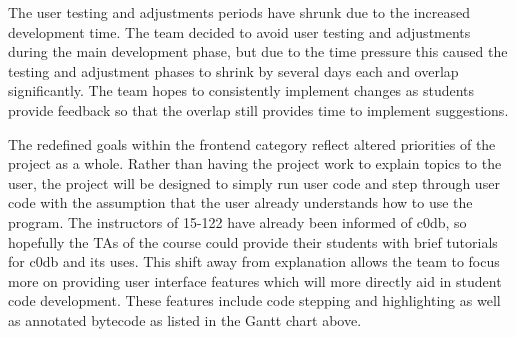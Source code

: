 \documentclass[11pt]{article}
\begin{document}
\par
The user testing and adjustments periods have shrunk due to the increased
development time. The team decided to avoid user testing and adjustments during
the main development phase, but due to the time pressure this caused the
testing and adjustment phases to shrink by several days each and overlap
significantly. The team hopes to consistently implement changes as students
provide feedback so that the overlap still provides time to implement
suggestions.
\par
The redefined goals within the frontend category reflect altered priorities of
the project as a whole. Rather than having the project work to explain topics
to the user, the project will be designed to simply run user code and step
through user code with the assumption that the user already understands how to
use the program. The instructors of 15-122 have already been informed of c0db,
so hopefully the TAs of the course could provide their students with brief
tutorials for c0db and its uses. This shift away from explanation allows the
team to focus more on providing user interface features which will more
directly aid in student code development. These features include code stepping
and highlighting as well as annotated bytecode as listed in the Gantt chart
above.
\end{document}
